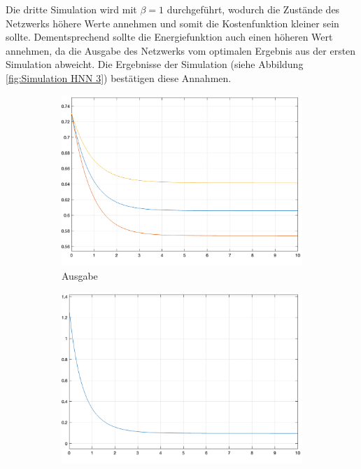 Die dritte Simulation wird mit \(\beta=1\) durchgeführt, wodurch die Zustände des Netzwerks höhere Werte annehmen und somit die Kostenfunktion kleiner sein sollte. Dementsprechend sollte die Energiefunktion auch einen höheren Wert annehmen, da die Ausgabe des Netzwerks vom optimalen Ergebnis aus der ersten Simulation abweicht. Die Ergebnisse der Simulation (siehe Abbildung \ref{fig:Simulation HNN 3}) bestätigen diese Annahmen.

\begin{figure}[h]
  \centering
  \begin{subfigure}[b]{0.32\textwidth}
    \includegraphics[width=\textwidth]{abbildungen/hnn_simulation_3_ausgabe.png}
    \caption{Ausgabe}
  \end{subfigure}%
  \hfill
  \begin{subfigure}[b]{0.32\textwidth}
    \includegraphics[width=\textwidth]{abbildungen/hnn_simulation_3_energiefunktion.png}

\end{subfigure}
\end{figure}
